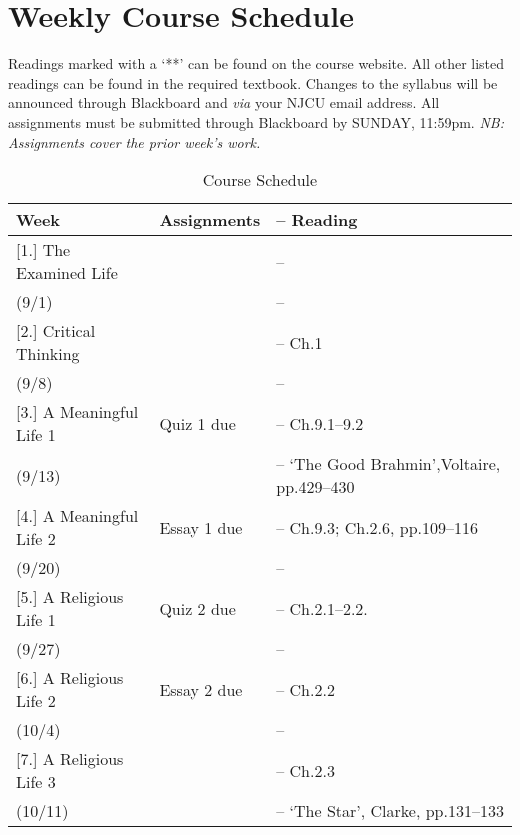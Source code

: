 \documentclass[article,oneside]{memoir}
\begin{document}
\section{Weekly Course Schedule}
Readings marked with a `**' can be found on the course website. All other listed readings can be found in the required textbook. Changes to the syllabus will be announced through Blackboard and \emph{via} your NJCU email address.  All assignments must be submitted through Blackboard by SUNDAY, 11:59pm. \emph{NB: Assignments cover the prior week's work.}

\begin{center}
\begin{longtable}{p{4.5cm}p{2cm}>{-- }p{6cm}}
 
  \caption{Course Schedule} \\
  \toprule
  \textbf{Week} &\textbf{Assignments} & \textbf{Reading} \\
  \midrule

  


[1.] The Examined Life		 & 				&   \\
(9/1)						&				&   \\  [1.8\baselineskip] \hline

[2.] Critical Thinking		 	& 				&  Ch.1\\
(9/8)						&				&  \\  [1.8\baselineskip] \hline

[3.] A Meaningful Life 1		& Quiz 1 due		&  Ch.9.1--9.2 \\
(9/13)					& 				&  `The Good Brahmin',Voltaire, pp.429--430 \\ [1.8\baselineskip] \hline
	
[4.] A Meaningful Life 2		& Essay 1	 due		&  Ch.9.3;  Ch.2.6, pp.109--116\\
(9/20)					& 				&   \\  [1.8\baselineskip] \hline

[5.] A Religious Life 1 		& Quiz 2	due		& Ch.2.1--2.2.\\ 
(9/27)					&				& \\   [1.8\baselineskip] \hline

[6.] A Religious Life 2			 & Essay 2 due		&   Ch.2.2\\
(10/4)					&				& \\ [1.8\baselineskip] \hline

[7.] A Religious Life 3			& 				& Ch.2.3\\
(10/11)					& 				& `The Star', Clarke, pp.131--133\\  [1.8\baselineskip]		 \hline


\end{longtable}
\end{center}
\end{document}
